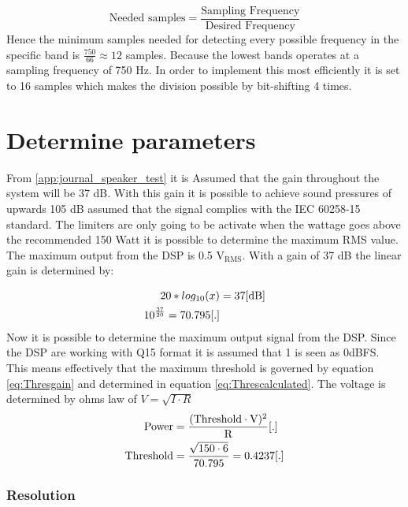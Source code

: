 \begin{equation}\label{eq:Minsample}
\text{Needed samples}= \frac{\text{Sampling Frequency}}{\text{Desired Frequency}}
\end{equation} 
Hence the minimum samples needed for detecting every possible frequency in the specific band is $\frac{750}{66} \approx 12$ samples. Because the lowest bands operates at a sampling frequency of 750 Hz. In order to implement this most efficiently it is set to 16 samples which makes the division possible by bit-shifting 4 times.

\section{Determine parameters}
From \autoref{app:journal_speaker_test} it is Assumed that the gain throughout the system will be 37 dB. With this gain it is possible to achieve sound pressures of upwards 105 dB assumed that the signal complies with the IEC 60258-15 standard. The limiters are only going to be activate when the wattage goes above the recommended 150 Watt it is possible to determine the maximum RMS value. The maximum output from the DSP is 0.5 $\text{V}_\text{RMS}$. With a gain of 37 dB the linear gain is determined by:

\begin{align}
20*log_{10}(x)&=37 \enhed{dB}
\\
10^{\frac{37}{20}} = 70.795 \enhed{.}
\end{align}
Now it is possible to determine the maximum output signal from the DSP. Since the DSP are working with Q15 format it is assumed that 1 is seen as 0dBFS. This means effectively that the maximum threshold is governed by equation \ref{eq:Thresgain} and determined in equation \ref{eq:Threscalculated}. The voltage is determined by ohms law of $V=\sqrt{I \cdot R}$
\vspace{-3mm}
\begin{align}
\text{Power}&=\frac{(\text{Threshold} \cdot \text{V})^2}{\text{R}}\enhed{.}\label{eq:Thresgain}
\\
\text{Threshold}&=\frac{\sqrt{150 \cdot 6}}{70.795}=0.4237\enhed{.}\label{eq:Threscalculated}
\end{align}


\subsubsection*{Resolution}

